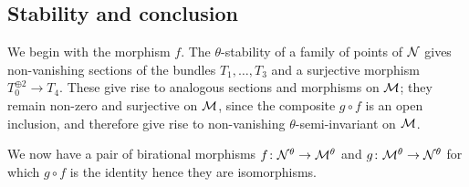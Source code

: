 \documentclass{amsart}
\theoremstyle{definition}
\begin{document}
\subsection{Stability and conclusion}

We begin with the morphism $f$.
The $\theta$-stability of a family of points of $\mathcal{N}$ gives non-vanishing sections of the bundles $T_1, \ldots, T_3$ and a surjective morphism $T_0^{\oplus 2} \rightarrow T_4$.
These give rise to analogous sections and morphisms on $\mathcal{M}$; they remain non-zero and surjective on $\mathcal{M}$, since the composite $g \circ f$ is an open inclusion, and therefore give rise to non-vanishing $\theta$-semi-invariant on $\mathcal{M}$.

We now have a pair of birational morphisms $f \colon \mathcal{N}^\theta \rightarrow \mathcal{M}^\theta$ and $g \colon \mathcal{M}^\theta \rightarrow \mathcal{N}^\theta$ for which $g \circ f$ is the identity hence they are isomorphisms.
\end{document}
